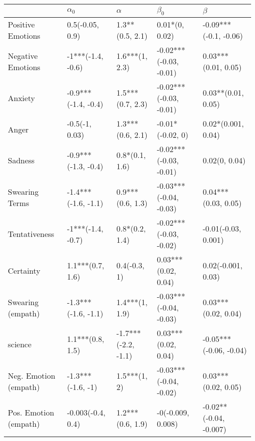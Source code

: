 \begin{tabular}{lllll}
\toprule
{} &           $\alpha_0$ &             $\alpha$ &               $\beta_0$ &                 $\beta$ \\
\midrule
Positive Emotions     &      0.5(-0.05, 0.9) &      1.3**(0.5, 2.1) &          0.01*(0, 0.02) &   -0.09***(-0.1, -0.06) \\
Negative Emotions     &    -1***(-1.4, -0.6) &       1.6***(1, 2.3) &  -0.02***(-0.03, -0.01) &     0.03***(0.01, 0.05) \\
Anxiety               &  -0.9***(-1.4, -0.4) &     1.5***(0.7, 2.3) &  -0.02***(-0.03, -0.01) &      0.03**(0.01, 0.05) \\
Anger                 &       -0.5(-1, 0.03) &     1.3***(0.6, 2.1) &        -0.01*(-0.02, 0) &      0.02*(0.001, 0.04) \\
Sadness               &  -0.9***(-1.3, -0.4) &       0.8*(0.1, 1.6) &  -0.02***(-0.03, -0.01) &           0.02(0, 0.04) \\
Swearing Terms        &  -1.4***(-1.6, -1.1) &     0.9***(0.6, 1.3) &  -0.03***(-0.04, -0.03) &     0.04***(0.03, 0.05) \\
Tentativeness         &    -1***(-1.4, -0.7) &       0.8*(0.2, 1.4) &  -0.02***(-0.03, -0.02) &     -0.01(-0.03, 0.001) \\
Certainty             &     1.1***(0.7, 1.6) &         0.4(-0.3, 1) &     0.03***(0.02, 0.04) &      0.02(-0.001, 0.03) \\
Swearing (empath)     &  -1.3***(-1.6, -1.1) &       1.4***(1, 1.9) &  -0.03***(-0.04, -0.03) &     0.03***(0.02, 0.04) \\
science               &     1.1***(0.8, 1.5) &  -1.7***(-2.2, -1.1) &     0.03***(0.02, 0.04) &  -0.05***(-0.06, -0.04) \\
Neg. Emotion (empath) &    -1.3***(-1.6, -1) &         1.5***(1, 2) &  -0.03***(-0.04, -0.02) &     0.03***(0.02, 0.05) \\
Pos. Emotion (empath) &    -0.003(-0.4, 0.4) &     1.2***(0.6, 1.9) &       -0(-0.009, 0.008) &  -0.02**(-0.04, -0.007) \\
\bottomrule
\end{tabular}
